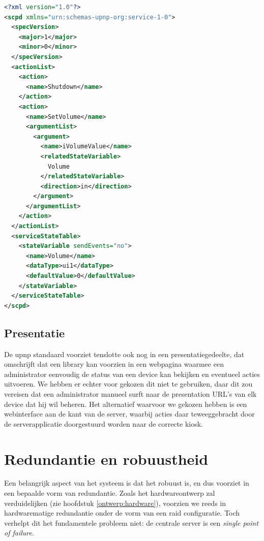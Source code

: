 \begin{lstlisting}[language=XML, float, caption=Voorbeeld van een \acs{scpd} bestand., label=lst:scpd]
<?xml version="1.0"?>
<scpd xmlns="urn:schemas-upnp-org:service-1-0">
  <specVersion>
    <major>1</major>
    <minor>0</minor>
  </specVersion>
  <actionList>
    <action>
      <name>Shutdown</name>
    </action>
    <action>
      <name>SetVolume</name>
      <argumentList>
        <argument>
          <name>iVolumeValue</name>
          <relatedStateVariable>
            Volume
          </relatedStateVariable>
          <direction>in</direction>
        </argument>
      </argumentList>
    </action>
  </actionList>
  <serviceStateTable>
    <stateVariable sendEvents="no">
      <name>Volume</name>
      <dataType>ui1</dataType>
      <defaultValue>0</defaultValue>
    </stateVariable>
  </serviceStateTable>
</scpd>
\end{lstlisting}

\subsection{Presentatie}

De \ac{upnp} standaard voorziet tenslotte ook nog in een presentatiegedeelte, dat omschrijft dat een library kan voorzien in een webpagina waarmee een administrator eenvoudig de status van een device kan bekijken en eventueel acties uitvoeren. We hebben er echter voor gekozen dit niet te gebruiken, daar dit zou vereisen dat een administrator manueel surft naar de presentation URL's van elk device dat hij wil beheren. Het alternatief waarvoor we gekozen hebben is een webinterface aan de kant van de server, waarbij acties daar teweeggebracht door de serverapplicatie doorgestuurd worden naar de correcte kiosk.

\section{Redundantie en robuustheid}
\label{sec:redundantie}

Een belangrijk aspect van het systeem is dat het robuust is, en dus voorziet in een bepaalde vorm van redundantie. Zoals het hardwareontwerp zal verduidelijken (zie hoofdstuk \ref{ontwerp:hardware}), voorzien we reeds in hardwarematige redundantie onder de vorm van een \ac{raid} configuratie. Toch verhelpt dit het fundamentele probleem niet: de centrale server is een \emph{single point of failure}.

